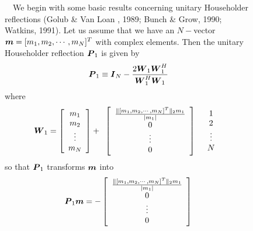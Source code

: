 \begin{figure}
{\begin{minipage} {140.0mm}
$\quad$We begin with some basic results concerning unitary Householder 
reflections (Golub \& Van Loan , 1989; Bunch \& Grow, 1990; Watkins, 
1991). 
Let us assume that we have an $N-$vector ${\mbox{\boldmath$\mit m$\unboldmath}}=[m_1, m_2,
\cdots, m_N]^{T}$ with complex elements. Then the unitary Householder 
reflection
${\mbox{\boldmath$\mit P$\unboldmath}}_1$ is given by
\begin{equation} \label{P1def}
{\mbox{\boldmath$\mit P$\unboldmath}}_1\equiv {\mbox{\boldmath$\mit I$\unboldmath}}_N - \frac{2 {\mbox{\boldmath$\mit W$\unboldmath}}_{1} {\mbox{\boldmath$\mit W$\unboldmath}}_{1}^{H} 
}{{\mbox{\boldmath$\mit W$\unboldmath}}_{1}^{H}{\mbox{\boldmath$\mit W$\unboldmath}}_{1}}
\end{equation}
where 
\begin{equation} \label{W1def}
{\mbox{\boldmath$\mit W$\unboldmath}}_{1}=\left[ \begin{array}{c}m_1\\ m_2\\ \vdots\\ m_N \end{array} 
\right]+\begin{array}{cl}\left[ \begin{array}{c}\frac{\|[m_1, m_2,
\cdots, m_N]^{T}\|_{2} m_1}{|m_1|}\\ 0\\ \vdots\\ 0 \end{array} 
\right]&\begin{array}{c}1\\2\\ \vdots\\N \end{array} \end{array}
\end{equation}
so that ${\mbox{\boldmath$\mit P$\unboldmath}}_1$ transforms ${\mbox{\boldmath$\mit m$\unboldmath}}$ into
\[
{\mbox{\boldmath$\mit P$\unboldmath}}_1 {\mbox{\boldmath$\mit m$\unboldmath}}=-\left[ \begin{array}{c}\frac{\|[m_1, m_2,
\cdots, m_N]^{T}\|_{2} m_1}{|m_1|}\\ 0\\ \vdots\\ 0 \end{array}\right]
\]


\end{minipage}}
\end{figure}

